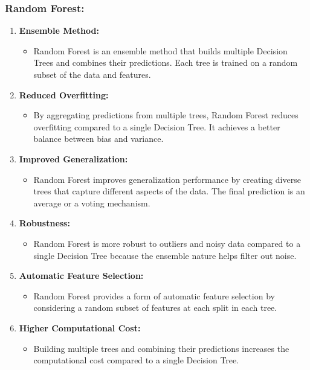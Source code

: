 \documentclass[
]{book}
\providecommand{\tightlist}{%
  \setlength{\itemsep}{0pt}\setlength{\parskip}{0pt}}
\begin{document}
\hypertarget{random-forest}{%
\subsubsection{Random Forest:}\label{random-forest}}

\begin{enumerate}
\def\labelenumi{\arabic{enumi}.}
\tightlist
\item
  \textbf{Ensemble Method:}

  \begin{itemize}
  \tightlist
  \item
    Random Forest is an ensemble method that builds multiple Decision Trees and combines their predictions. Each tree is trained on a random subset of the data and features.
  \end{itemize}
\item
  \textbf{Reduced Overfitting:}

  \begin{itemize}
  \tightlist
  \item
    By aggregating predictions from multiple trees, Random Forest reduces overfitting compared to a single Decision Tree. It achieves a better balance between bias and variance.
  \end{itemize}
\item
  \textbf{Improved Generalization:}

  \begin{itemize}
  \tightlist
  \item
    Random Forest improves generalization performance by creating diverse trees that capture different aspects of the data. The final prediction is an average or a voting mechanism.
  \end{itemize}
\item
  \textbf{Robustness:}

  \begin{itemize}
  \tightlist
  \item
    Random Forest is more robust to outliers and noisy data compared to a single Decision Tree because the ensemble nature helps filter out noise.
  \end{itemize}
\item
  \textbf{Automatic Feature Selection:}

  \begin{itemize}
  \tightlist
  \item
    Random Forest provides a form of automatic feature selection by considering a random subset of features at each split in each tree.
  \end{itemize}
\item
  \textbf{Higher Computational Cost:}

  \begin{itemize}
  \tightlist
  \item
    Building multiple trees and combining their predictions increases the computational cost compared to a single Decision Tree.
  \end{itemize}
\end{enumerate}
\end{document}
